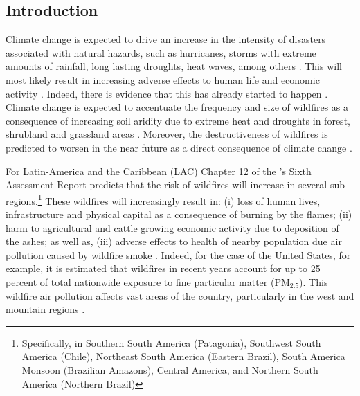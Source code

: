 \documentclass[11pt]{article}
\begin{document}
\begin{spacing}{1.5}

\section{Introduction}

Climate change is expected to drive an increase in the intensity of disasters associated with natural hazards, such as hurricanes, storms with extreme amounts of rainfall, long lasting droughts, heat waves, among others \citep{IPCC2022climate}. This will most likely result in increasing adverse effects to human life and economic activity \citep{IPCC2022climate}. Indeed, there is evidence that this has already started to happen \citep{coronese2019evidence}. Climate change is expected to accentuate the frequency and size of wildfires as a consequence of increasing soil aridity due to extreme heat and droughts in forest, shrubland and grassland areas \citep{malevsky2008assessment, gillett2004detecting, pyne2019fire}. Moreover, the destructiveness of wildfires is predicted to worsen in the near future as a direct consequence of climate change \citep{abatzoglou2016impact, bowman2017human, flannigan2009impacts, flannigan2013global}.

For Latin-America and the Caribbean (LAC) Chapter 12 of the \cite{IPCC2022climate}’s Sixth Assessment Report predicts that the risk of wildfires will increase in several sub-regions.\footnote{Specifically, in Southern South America (Patagonia), Southwest South America (Chile), Northeast South America (Eastern Brazil), South America Monsoon (Brazilian Amazons), Central America, and Northern South America (Northern Brazil)} These wildfires will increasingly result in: (i) loss of human lives, infrastructure and physical capital as a consequence of burning by the flames; (ii) harm to agricultural and cattle growing economic activity due to deposition of the ashes; as well as, (iii) adverse effects to health of nearby population due air pollution caused by wildfire smoke \citep{flannigan2009impacts,bowman2017human,cancelo2018incendios}. Indeed, for the case of the United States, for example, it is estimated that wildfires in recent years account for up to 25 percent of total nationwide exposure to fine particular matter (PM$_{2.5}$). This wildfire air pollution affects vast areas of the country, particularly in the west and mountain regions \citep{burke2021changing}. 


\end{spacing}
\end{document}
